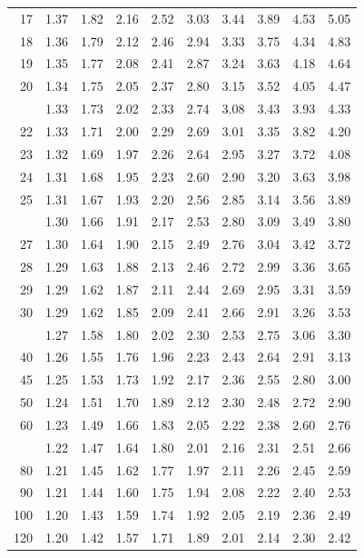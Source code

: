\documentclass[10pt]{article}
\begin{document}
\begin{longtable}{@{}r!{\vrule width 0.8pt\hspace{0.55em}}rrrrrrrrr@{}}
17 & 1.37 & 1.82 & 2.16 & 2.52 & 3.03 & 3.44 & 3.89 & 4.53 & 5.05 \\
18 & 1.36 & 1.79 & 2.12 & 2.46 & 2.94 & 3.33 & 3.75 & 4.34 & 4.83 \\
19 & 1.35 & 1.77 & 2.08 & 2.41 & 2.87 & 3.24 & 3.63 & 4.18 & 4.64 \\
20 & 1.34 & 1.75 & 2.05 & 2.37 & 2.80 & 3.15 & 3.52 & 4.05 & 4.47 \\
 & 1.33 & 1.73 & 2.02 & 2.33 & 2.74 & 3.08 & 3.43 & 3.93 & 4.33 \\
22 & 1.33 & 1.71 & 2.00 & 2.29 & 2.69 & 3.01 & 3.35 & 3.82 & 4.20 \\
23 & 1.32 & 1.69 & 1.97 & 2.26 & 2.64 & 2.95 & 3.27 & 3.72 & 4.08 \\
24 & 1.31 & 1.68 & 1.95 & 2.23 & 2.60 & 2.90 & 3.20 & 3.63 & 3.98 \\
25 & 1.31 & 1.67 & 1.93 & 2.20 & 2.56 & 2.85 & 3.14 & 3.56 & 3.89 \\
 & 1.30 & 1.66 & 1.91 & 2.17 & 2.53 & 2.80 & 3.09 & 3.49 & 3.80 \\
27 & 1.30 & 1.64 & 1.90 & 2.15 & 2.49 & 2.76 & 3.04 & 3.42 & 3.72 \\
28 & 1.29 & 1.63 & 1.88 & 2.13 & 2.46 & 2.72 & 2.99 & 3.36 & 3.65 \\
29 & 1.29 & 1.62 & 1.87 & 2.11 & 2.44 & 2.69 & 2.95 & 3.31 & 3.59 \\
30 & 1.29 & 1.62 & 1.85 & 2.09 & 2.41 & 2.66 & 2.91 & 3.26 & 3.53 \\
 & 1.27 & 1.58 & 1.80 & 2.02 & 2.30 & 2.53 & 2.75 & 3.06 & 3.30 \\
40 & 1.26 & 1.55 & 1.76 & 1.96 & 2.23 & 2.43 & 2.64 & 2.91 & 3.13 \\
45 & 1.25 & 1.53 & 1.73 & 1.92 & 2.17 & 2.36 & 2.55 & 2.80 & 3.00 \\
50 & 1.24 & 1.51 & 1.70 & 1.89 & 2.12 & 2.30 & 2.48 & 2.72 & 2.90 \\
60 & 1.23 & 1.49 & 1.66 & 1.83 & 2.05 & 2.22 & 2.38 & 2.60 & 2.76 \\
 & 1.22 & 1.47 & 1.64 & 1.80 & 2.01 & 2.16 & 2.31 & 2.51 & 2.66 \\
80 & 1.21 & 1.45 & 1.62 & 1.77 & 1.97 & 2.11 & 2.26 & 2.45 & 2.59 \\
90 & 1.21 & 1.44 & 1.60 & 1.75 & 1.94 & 2.08 & 2.22 & 2.40 & 2.53 \\
100 & 1.20 & 1.43 & 1.59 & 1.74 & 1.92 & 2.05 & 2.19 & 2.36 & 2.49 \\
120 & 1.20 & 1.42 & 1.57 & 1.71 & 1.89 & 2.01 & 2.14 & 2.30 & 2.42 \\

\end{longtable}
\end{document}
